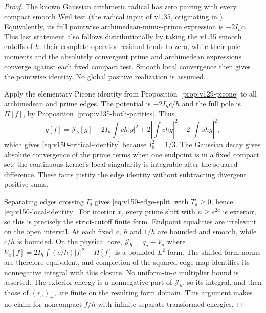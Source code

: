 \begin{proof}
The known Gaussian arithmetic radical has zero pairing with every
compact smooth Weil test (the radical input of v1.35, originating in
\cite[Section~3]{ConnesConsani2023}). Equivalently, its full pointwise
archimedean-minus-prime expression is $-2I_hc$. This last statement
also follows distributionally by taking the v1.35 smooth cutoffs of
$h$: their complete operator residual tends to zero, while their pole
moments and the absolutely convergent prime and archimedean expressions
converge against each fixed compact test. Smooth local convergence then
gives the pointwise identity. No global positive realization is assumed.

Apply the elementary Picone identity from
Proposition~\ref{prop:v129-picone} to all archimedean and prime edges.
The potential is $-2I_hc/h$ and the full pole is $\Pi[f]$, by
Proposition~\ref{prop:v135-both-parities}. Thus
\[
 q[f]=\mathcal J_h[g]-2I_h\int ch|g|^2
               +2\left|\int chg\right|^2-2\left|\int shg\right|^2,
\]
which gives \eqref{eq:v150-critical-identity} because $I_h^2=1/3$.
The Gaussian decay gives absolute convergence of the prime terms when
one endpoint is in a fixed compact set; the continuous kernel's local
singularity is integrable after the squared difference. These facts
justify the edge identity without subtracting divergent positive sums.

Separating edges crossing $I_a^c$ gives \eqref{eq:v150-edge-split}
with $T_a\ge0$, hence \eqref{eq:v150-local-identity}.
For interior $x$, every prime shift with $n\ge e^{2a}$ is exterior,
so this is precisely the strict-cutoff finite form. Endpoint equalities
are irrelevant on the open interval. At each fixed $a$, $h$ and $1/h$
are bounded and smooth, while $c/h$ is bounded. On the physical core,
$\mathcal J_h=q_a+V_a$ where
$V_a[f]=2I_h\int(c/h)|f|^2-\Pi[f]$ is a bounded $L^2$ form.
The shifted form norms are therefore equivalent, and completion of the
squared-edge map identifies its nonnegative integral with this closure.
No uniform-in-$a$ multiplier bound is asserted. The exterior energy is
a nonnegative part of $\mathcal J_h$, so its integral, and then those
of $(r_a)_\pm$, are finite on the resulting form domain. This argument makes no
claim for noncompact $f/h$ with infinite separate transformed energies.
\end{proof}

